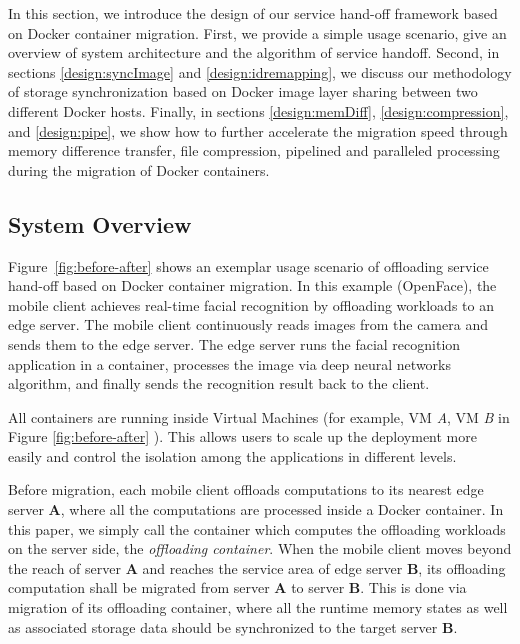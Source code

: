 



In this section, we introduce the design of our service hand-off framework based on Docker container migration. First, we provide a simple usage scenario, give an overview of system architecture and the algorithm of service handoff. Second, in sections \ref{design:syncImage} and \ref{design:idremapping}, we discuss our methodology of storage synchronization based on Docker image layer sharing between two different Docker hosts. Finally, in sections \ref{design:memDiff}, \ref{design:compression}, and \ref{design:pipe}, we show how to further accelerate the migration speed through memory difference transfer, file compression, pipelined and paralleled processing during the migration of Docker containers.

\subsection{System Overview}

Figure~\ref{fig:before-after} shows an exemplar usage scenario of offloading service hand-off based on Docker container migration. 
In this example (OpenFace\cite{openface2016}), the mobile client achieves real-time facial recognition by offloading workloads to an edge server. 
The mobile client continuously reads images from the camera and sends them to the edge server. 
The edge server runs the facial recognition application in a container, processes the image via deep neural networks algorithm, and finally sends the recognition result  back to the client. 

All containers are running inside Virtual Machines (for example, VM \textit{A}, VM \textit{B} in Figure \ref{fig:before-after} ). This allows users to scale up the deployment more easily and control the isolation among the applications in different levels.


Before migration, each mobile client offloads computations to its nearest edge server \textbf{A}, where all the computations are processed inside a Docker container. 
In this paper, we simply call the container which computes the offloading workloads on the server side, the \textit{offloading container}.
When the mobile client moves beyond the reach of server \textbf{A} and reaches the service area of edge server \textbf{B}, its offloading computation shall be migrated from server \textbf{A} to server \textbf{B}. This is done via migration of its offloading container, where all the runtime memory states as well as associated storage data should be synchronized to the target server \textbf{B}.

